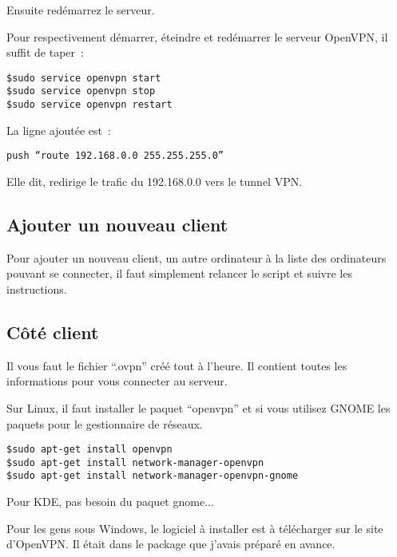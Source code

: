 Ensuite redémarrez le serveur.

Pour respectivement démarrer, éteindre et redémarrer le serveur OpenVPN, il suffit de taper~:
\begin{verbatim}
$sudo service openvpn start
$sudo service openvpn stop
$sudo service openvpn restart
\end{verbatim}

La ligne ajoutée est~:
\begin{verbatim}
push “route 192.168.0.0 255.255.255.0”
\end{verbatim}

Elle dit, redirige le trafic du 192.168.0.0 vers le tunnel VPN. 



\subsection{Ajouter un nouveau client}

Pour ajouter un nouveau client, un autre ordinateur à la liste des ordinateurs pouvant se connecter, il faut simplement relancer le script et suivre les instructions.

\subsection{Côté client}

Il vous faut le fichier ``.ovpn'' créé tout à l'heure. Il contient toutes les informations pour vous connecter au serveur.

Sur Linux, il faut installer le paquet ``openvpn'' et si vous utilisez GNOME les paquets pour le gestionnaire de réseaux.



\begin{verbatim}
$sudo apt-get install openvpn 
$sudo apt-get install network-manager-openvpn
$sudo apt-get install network-manager-openvpn-gnome
\end{verbatim}

Pour KDE, pas besoin du paquet gnome...

Pour les gens sous Windows, le logiciel à installer est à télécharger sur le site d'OpenVPN. Il était dans le package que j'avais préparé en avance.
